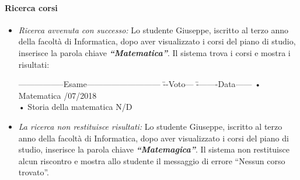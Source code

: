 \paragraph{Ricerca corsi}
\begin{itemize}
	\item \textit{Ricerca avvenuta con successo:}
	Lo studente Giuseppe, iscritto al terzo anno della facoltà di Informatica, dopo aver visualizzato i corsi del piano di studio, inserisce la parola chiave \textbf{\textit{“Matematica”}}. Il sistema trova i corsi e mostra i risultati:

	\begin{tabbing}
		\hspace{1cm}-----------------Esame--------------------------- \= --Voto--- \= --------Data------ \kill
		\hspace{1cm} • Matematica  /07/2018 \\
		\hspace{1cm} • Storia della matematica \> N/D \>\\
	\end{tabbing}

	\item \textit{La ricerca non restituisce risultati:} 
	Lo studente Giuseppe, iscritto al terzo anno della facoltà di Informatica, dopo aver visualizzato i corsi del piano di studio, inserisce la parola chiave \textbf{\textit{“Matemagica”}}. Il sistema non restituisce alcun riscontro e mostra allo studente il messaggio di errore “Nessun corso trovato”.
\end{itemize}

